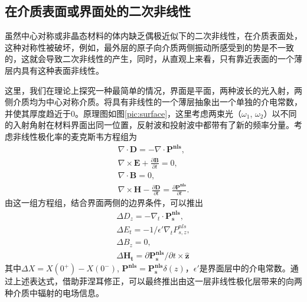 \documentclass[UTF8,a4paper,cs4size,hyperref]{ctexart}
\begin{document}
\subsection{在介质表面或界面处的二次非线性}
虽然中心对称或非晶态材料的体内缺乏偶极近似下的二次非线性，在介质表面处，这种对称性被破坏，例如，最外层的原子向介质两侧振动所感受到的势是不一致的，这就会导致二次非线性的产生，同时，从直观上来看，只有靠近表面的一个薄层内具有这种表面非线性。

这里，我们在理论上探究一种最简单的情况，界面是平面，两种波长的光入射，两侧介质均为中心对称介质。将具有非线性的一个薄层抽象出一个单独的介电常数，并使其厚度趋近于0。原理图如图\ref{pic:surface}，这里考虑两束光（$\omega_1$, $\omega_2$）以不同的入射角射在材料界面出同一位置，反射波和投射波中都带有了新的频率分量。考虑非线性极化率的麦克斯韦方程组为
\begin{gather}
\nabla \cdot \mathbf{D}  = -\nabla \cdot \mathbf{P^{nls}} , \\
\nabla \times \mathbf{E }	+ \frac{\partial\mathbf{B} }{\partial t} = 0, \\
\nabla \cdot \mathbf{B} = 0, \\
\nabla \times \mathbf{H} - \frac{\partial \mathbf{D}}{\partial t} = \frac{\partial \mathbf{P^{nls}}}{\partial t}.
\end{gather}
由这一组方程组，结合界面两侧的边界条件，可以推出\cite{heinz1991second}
\begin{gather}
\Delta D_z = -\nabla_t \cdot \mathbf{P_s^{nls}}, \\
\Delta E_t = -1/\epsilon' \nabla_t P_{s,z}^{nls}, \\
\Delta B_z = 0, \\
\Delta \mathbf{H_t} = \partial \mathbf{P_s^{nls}}/\partial t \times \mathbf{\hat z} 
\end{gather}
其中$\Delta X = X(0^+)-X(0^-)$, $\mathbf{P^{nls}}  = \mathbf{P_s^{nls}}\delta(z)$，$\epsilon'$是界面层中的介电常数。通过上述表达式，借助菲涅耳修正，可以最终推出由这一层非线性极化层带来的向两种介质中辐射的电场信息\cite{heinz1991second}。
\end{document}
